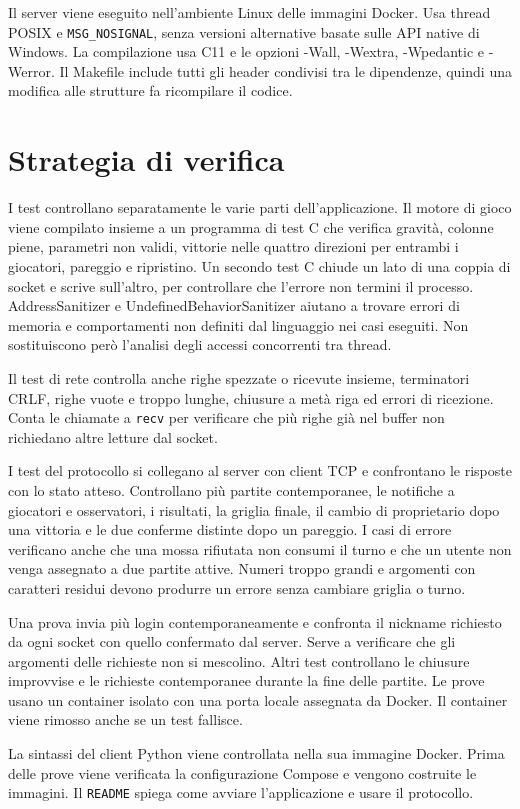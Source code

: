 \documentclass[11pt,a4paper]{article}
\begin{document}
Il server viene eseguito nell'ambiente Linux delle immagini Docker. Usa thread POSIX e \texttt{MSG\_NOSIGNAL}, senza versioni alternative basate sulle API native di Windows. La compilazione usa C11 e le opzioni -Wall, -Wextra, -Wpedantic e -Werror. Il Makefile include tutti gli header condivisi tra le dipendenze, quindi una modifica alle strutture fa ricompilare il codice.

\clearpage

\section{Strategia di verifica}

I test controllano separatamente le varie parti dell'applicazione. Il motore di gioco viene compilato insieme a un programma di test C che verifica gravità, colonne piene, parametri non validi, vittorie nelle quattro direzioni per entrambi i giocatori, pareggio e ripristino. Un secondo test C chiude un lato di una coppia di socket e scrive sull'altro, per controllare che l'errore non termini il processo. AddressSanitizer e UndefinedBehaviorSanitizer aiutano a trovare errori di memoria e comportamenti non definiti dal linguaggio nei casi eseguiti. Non sostituiscono però l'analisi degli accessi concorrenti tra thread.

Il test di rete controlla anche righe spezzate o ricevute insieme, terminatori CRLF, righe vuote e troppo lunghe, chiusure a metà riga ed errori di ricezione. Conta le chiamate a \texttt{recv} per verificare che più righe già nel buffer non richiedano altre letture dal socket.

I test del protocollo si collegano al server con client TCP e confrontano le risposte con lo stato atteso. Controllano più partite contemporanee, le notifiche a giocatori e osservatori, i risultati, la griglia finale, il cambio di proprietario dopo una vittoria e le due conferme distinte dopo un pareggio. I casi di errore verificano anche che una mossa rifiutata non consumi il turno e che un utente non venga assegnato a due partite attive. Numeri troppo grandi e argomenti con caratteri residui devono produrre un errore senza cambiare griglia o turno.

Una prova invia più login contemporaneamente e confronta il nickname richiesto da ogni socket con quello confermato dal server. Serve a verificare che gli argomenti delle richieste non si mescolino. Altri test controllano le chiusure improvvise e le richieste contemporanee durante la fine delle partite. Le prove usano un container isolato con una porta locale assegnata da Docker. Il container viene rimosso anche se un test fallisce.

La sintassi del client Python viene controllata nella sua immagine Docker. Prima delle prove viene verificata la configurazione Compose e vengono costruite le immagini. Il \texttt{README} spiega come avviare l'applicazione e usare il protocollo.
\end{document}
